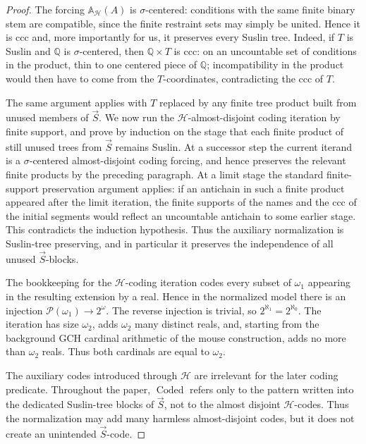 \documentclass[a4paper,11pt]{article}
\begin{document}
\begin{proof}
The forcing $\mathbb A_{\mathcal H}(A)$ is $\sigma$-centered: conditions with the same finite binary stem are compatible, since the finite restraint sets may simply be united.  Hence it is ccc and, more importantly for us, it preserves every Suslin tree.  Indeed, if $T$ is Suslin and $\mathbb Q$ is $\sigma$-centered, then $\mathbb Q\times T$ is ccc: on an uncountable set of conditions in the product, thin to one centered piece of $\mathbb Q$; incompatibility in the product would then have to come from the $T$-coordinates, contradicting the ccc of $T$.

The same argument applies with $T$ replaced by any finite tree product built from unused members of $\vec S$.  We now run the $\mathcal H$-almost-disjoint coding iteration by finite support, and prove by induction on the stage that each finite product of still unused trees from $\vec S$ remains Suslin.  At a successor step the current iterand is a $\sigma$-centered almost-disjoint coding forcing, and hence preserves the relevant finite products by the preceding paragraph.  At a limit stage the standard finite-support preservation argument applies: if an antichain in such a finite product appeared after the limit iteration, the finite supports of the names and the ccc of the initial segments would reflect an uncountable antichain to some earlier stage.  This contradicts the induction hypothesis.  Thus the auxiliary normalization is Suslin-tree preserving, and in particular it preserves the independence of all unused $\vec S$-blocks.

The bookkeeping for the $\mathcal H$-coding iteration codes every subset of $\omega_1$ appearing in the resulting extension by a real.  Hence in the normalized model there is an injection $\mathcal P(\omega_1)\to 2^\omega$.  The reverse injection is trivial, so $2^{\aleph_1}=2^{\aleph_0}$.  The iteration has size $\omega_2$, adds $\omega_2$ many distinct reals, and, starting from the background GCH cardinal arithmetic of the mouse construction, adds no more than $\omega_2$ reals.  Thus both cardinals are equal to $\omega_2$.

The auxiliary codes introduced through $\mathcal H$ are irrelevant for the later coding predicate.  Throughout the paper, $\operatorname{Coded}$ refers only to the pattern written into the dedicated Suslin-tree blocks of $\vec S$, not to the almost disjoint $\mathcal H$-codes.  Thus the normalization may add many harmless almost-disjoint codes, but it does not create an unintended $\vec S$-code.
\end{proof}
\end{document}
